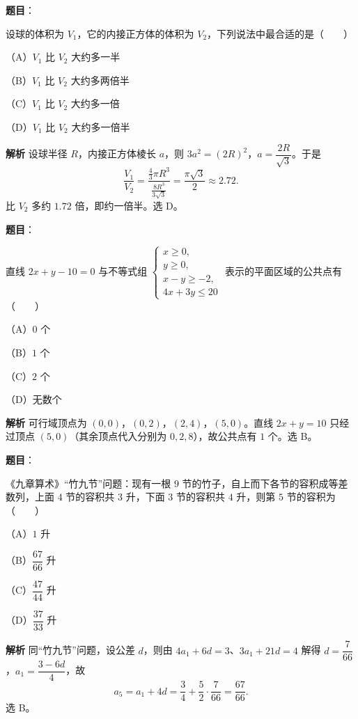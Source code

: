 \begin{answer}

\textbf{题目}：

设球的体积为 $V_1$，它的内接正方体的体积为 $V_2$，下列说法中最合适的是\mbox{（　　）}

（A）$V_1$ 比 $V_2$ 大约多一半

（B）$V_1$ 比 $V_2$ 大约多两倍半

（C）$V_1$ 比 $V_2$ 大约多一倍

（D）$V_1$ 比 $V_2$ 大约多一倍半

\textbf{解析}
设球半径 $R$，内接正方体棱长 $a$，则 $3a^2=(2R)^2$，$a=\dfrac{2R}{\sqrt3}$。于是
\nopagebreak[4]
\[\frac{V_1}{V_2}=\frac{\frac43\pi R^3}{\frac{8R^3}{3\sqrt3}}=\frac{\pi\sqrt3}{2}\approx2.72.\]
比 $V_2$ 多约 $1.72$ 倍，即约一倍半。选 D。


\end{answer}
\begin{answer}

\textbf{题目}：

直线 $2x+y-10=0$ 与不等式组 $\begin{cases}x\geqslant0,\\y\geqslant0,\\x-y\geqslant-2,\\4x+3y\leqslant20\end{cases}$ 表示的平面区域的公共点有\mbox{（　　）}

（A）$0$ 个

（B）$1$ 个

（C）$2$ 个

（D）无数个

\textbf{解析}
可行域顶点为 $(0,0)$，$(0,2)$，$(2,4)$，$(5,0)$。直线 $2x+y=10$ 只经过顶点 $(5,0)$（其余顶点代入分别为 $0,2,8$），故公共点有 $1$ 个。选 B。


\end{answer}
\begin{answer}

\textbf{题目}：

《九章算术》“竹九节”问题：现有一根 $9$ 节的竹子，自上而下各节的容积成等差数列，上面 $4$ 节的容积共 $3$ 升，下面 $3$ 节的容积共 $4$ 升，则第 $5$ 节的容积为\mbox{（　　）}

（A）$1$ 升

（B）$\dfrac{67}{66}$ 升

（C）$\dfrac{47}{44}$ 升

（D）$\dfrac{37}{33}$ 升

\textbf{解析}
同“竹九节”问题，设公差 $d$，则由 $4a_1+6d=3$、$3a_1+21d=4$ 解得 $d=\dfrac7{66}$，$a_1=\dfrac{3-6d}4$，故
\nopagebreak[4]
\[a_5=a_1+4d=\frac34+\frac52\cdot\frac7{66}=\frac{67}{66}.\]
选 B。


\end{answer}
